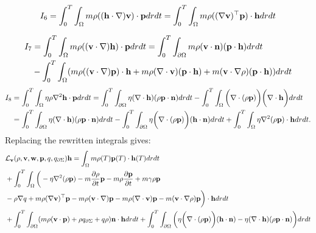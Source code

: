\begin{align*}
I_6 = \int_0^T \int_\Omega m \rho ((\mathbf{h} \cdot \nabla)\mathbf{v} ) \cdot\mathbf{p} dr dt = \int_0^T \int_\Omega m \rho ((\nabla \mathbf{v})^\top\mathbf{p}) \cdot  \mathbf{h} dr dt
\end{align*}

\begin{align*}
I_7&=\int_0^T \int_\Omega m \rho ((\mathbf{v} \cdot \nabla)\mathbf{h}) \cdot \mathbf{p} dr dt
= \int_0^T \int_{\partial \Omega} m \rho (\mathbf{v} \cdot \mathbf{n})(\mathbf{p} \cdot \mathbf{h})dr dt \\
&- \int_0^T \int_\Omega (m \rho ((\mathbf{v} \cdot \nabla)\mathbf{p})\cdot \mathbf{h} + m \rho (\nabla \cdot \mathbf{v})(\mathbf{p} \cdot \mathbf{h}) + m (\mathbf{v} \cdot \nabla \rho)(\mathbf{p} \cdot \mathbf{h}))drdt
\end{align*}
\begin{align*}
I_8 &= \int_0^T \int_\Omega \eta \rho \nabla^2 \mathbf{h} \cdot \mathbf{p} dr dt = \int_0^T \int_{\partial \Omega} \eta (\nabla \cdot \mathbf{h}) (\rho \mathbf{p} \cdot \mathbf{n}) dr dt - \int_0^T \int_\Omega \bigg(\nabla \cdot (\rho \mathbf{p}) \bigg) \bigg(\nabla \cdot \mathbf{h}\bigg) dr dt\\
& = \int_0^T \int_{\partial \Omega} \eta (\nabla \cdot \mathbf{h}) (\rho \mathbf{p} \cdot \mathbf{n}) dr dt -  \int_0^T \int_{\partial \Omega} \eta\bigg(\nabla \cdot(\rho \mathbf{p})\bigg) (\mathbf{h} \cdot \mathbf{n}) dr dt + \int_0^T \int_\Omega \eta \nabla^2(\rho \mathbf{p}) \cdot \mathbf{h} dr dt.
\end{align*}
Replacing the rewritten integrals gives:
\begin{align*}
&\mathcal{L}_{\mathbf{v}}(\rho,\mathbf{v},\mathbf{w},\mathbf{p},q,{q}_{\partial \Sigma}) \mathbf{h} = \int_\Omega m \rho(T) \mathbf{p}(T) \cdot \mathbf{h}(T) dr dt\\
&+\int_0^T \int_\Omega 
\bigg( - \eta\nabla^2 (\rho \mathbf{p}) - m \frac{\partial \rho}{\partial t} \mathbf{p}  -  m\rho \frac{\partial \mathbf{p}}{\partial t} +m \gamma \rho \mathbf{p}\\
&-\rho\nabla q +m \rho (\nabla \mathbf{v})^\top\mathbf{p} 
-m \rho (\mathbf{v} \cdot \nabla)\mathbf{p} - m \rho (\nabla \cdot \mathbf{v})\mathbf{p}  - m (\mathbf{v} \cdot \nabla \rho)\mathbf{p}  \bigg)\cdot  \mathbf{h} drdt\\
& +\int_0^T \int_{\partial\Omega} ( m \rho (\mathbf{v} \cdot \mathbf{p})+\rho  {q}_{\partial \Sigma} + q \rho)  \mathbf{n}\cdot \mathbf{h} dr dt + \int_0^T \int_{\partial \Omega} \bigg(\eta\bigg(\nabla \cdot(\rho \mathbf{p})\bigg) (\mathbf{h} \cdot \mathbf{n}) -   \eta (\nabla \cdot \mathbf{h}) (\rho \mathbf{p} \cdot \mathbf{n}) \bigg)dr dt\\
\end{align*}
